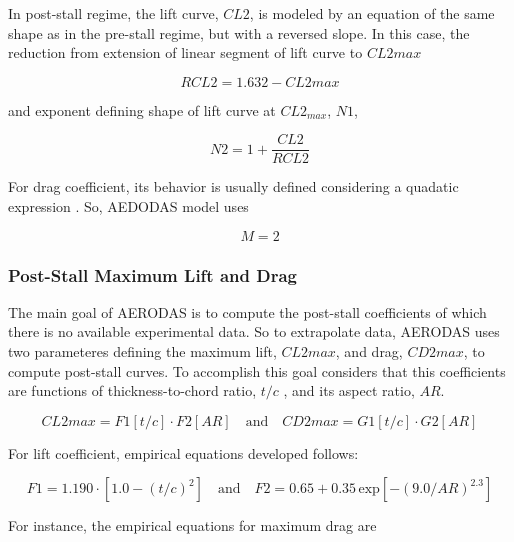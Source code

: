 In post-stall regime, the lift curve, $CL2$, is modeled by an equation of the same shape as in the pre-stall regime, but with a reversed slope. In this case, the reduction from extension of linear segment of lift curve to $CL2max$

\begin{equation}
    RCL2 = 1.632- CL2max
\end{equation}

\noindent and exponent defining shape of lift curve at $CL2_{max}$, $N1$,

\begin{equation}
    N2 = 1 + \frac{CL2}{RCL2}
\end{equation}

For drag coefficient, its behavior is usually defined considering a quadatic expression \cite{spera_models_2008}. So, AEDODAS model uses 

\begin{equation}
    M = 2
\end{equation}

\subsubsection{Post-Stall Maximum Lift and Drag}

The main goal of AERODAS is to compute the post-stall coefficients of which there is no available experimental data. So to extrapolate data, AERODAS uses two parameteres defining the maximum lift, $CL2max$, and drag, $CD2max$, to compute post-stall curves. To accomplish this goal \cite{spera_models_2008} considers that this coefficients are functions of thickness-to-chord ratio, $t/c$ , and its aspect ratio, $AR$.

\begin{equation}
    CL2max = F1  \left[ t/c \right] \cdot F2 \left[ AR \right] \quad \text{and} \quad CD2max= G1 \left[ t/c \right] \cdot G2 \left[ AR \right]
\end{equation}

For lift coefficient, empirical equations developed follows:

\begin{equation}
    F1=1.190\cdot\left[1.0-\left(t/c\right)^{2}\right] \quad \text{and} \quad F2= 0.65 + 0.35\,\mathrm{exp}\left[-\left(9.0\slash{A}R\right)^{2.3}\right]
\end{equation}

For instance, the empirical equations for maximum drag are

